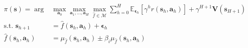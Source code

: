 \documentclass{article}
\newcommand{\state}{\ensuremath{\mathbf{s}}}
\newcommand{\action}{\ensuremath{\mathbf{a}}}
\newcommand{\noise}{\ensuremath{\bm\epsilon}}
\newcommand{\discount}{\ensuremath{\gamma}}
\newcommand{\horizon}{\ensuremath{h}}
\newcommand{\Horizon}{\ensuremath{H}}
\newcommand{\rewardFn}{\ensuremath{r}}
\newcommand{\optimisticTransition}{\ensuremath{\hat{f}}}
\newcommand{\optimisticTransitionMean}{\ensuremath{\mu_{\optimisticTransition}}}
\newcommand{\optimisticTransitionCov}{\ensuremath{\mu_{\optimisticTransition}}}
\newcommand{\optimisticTransitionSet}{\ensuremath{\mathcal{M}}}
\newcommand{\stateValueFn}{\ensuremath{\mathbf{V}}}
\newcommand{\policy}{\ensuremath{\pi}}
\begin{document}
\begin{align} \label{}
  \policy(\state) = \arg &\max_{\action_{0}} \max_{\action_{1}, \ldots, \action_{\Horizon}} \max_{\optimisticTransition \in \optimisticTransitionSet}
  \sum_{\horizon=0}^{\Horizon}  \mathbb{E}_{\noise_{\horizon}} \left[  \discount^{\horizon} \rewardFn(\state_{\horizon},\action_{\horizon}) \right] + \discount^{\Horizon+1} \stateValueFn(\state_{\Horizon+1}) \\
  \text{s.t. } \state_{\horizon+1} &= \optimisticTransition(\state_{\horizon}, \action_{\horizon}) + \noise_{\horizon} \\
  \optimisticTransition(\state_{\horizon}, \action_{\horizon}) &=
\optimisticTransitionMean(\state_{\horizon}, \action_{\horizon}) \pm \beta_{i}
\optimisticTransitionCov(\state_{\horizon}, \action_{\horizon})
\end{align}
\end{document}
